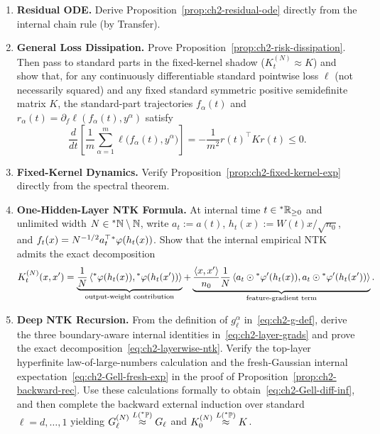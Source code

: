 \begin{enumerate}
\item \textbf{Residual ODE.} Derive Proposition~\ref{prop:ch2-residual-ode} directly from the internal chain rule (by Transfer).

\item \textbf{General Loss Dissipation.} Prove Proposition~\ref{prop:ch2-risk-dissipation}. Then pass to standard parts in the fixed-kernel shadow ($K_t^{(N)} \approx K$) and show that, for any continuously differentiable standard pointwise loss $\ell$ (not necessarily squared) and any fixed standard symmetric positive semidefinite matrix $K$, the standard-part trajectories $f_\alpha(t)$ and $r_\alpha(t) = \partial_f \ell(f_\alpha(t), y^\alpha)$ satisfy
\begin{equation}\label{eq:ch2-ex-gen-loss}
\frac{d}{dt}\left[ \frac{1}{m} \sum_{\alpha=1}^{m} \ell\bigl(f_\alpha(t), y^\alpha\bigr) \right] = -\frac{1}{m^2} r(t)^\top K r(t) \le 0.
\end{equation}

\item \textbf{Fixed-Kernel Dynamics.} Verify Proposition~\ref{prop:ch2-fixed-kernel-exp} directly from the spectral theorem.

\item \textbf{One-Hidden-Layer NTK Formula.} At internal time $t \in {}^*\mathbb{R}_{\ge 0}$ and unlimited width $N \in {}^*\mathbb{N} \setminus \mathbb{N}$, write $a_t := a(t)$, $h_t(x) := W(t)x / \sqrt{n_0}$, and $f_t(x) = N^{-1/2} a_t^\top {}^*\varphi(h_t(x))$. Show that the internal empirical NTK admits the exact decomposition
\begin{equation}\label{eq:ch2-ex-1layer-ntk}
K_t^{(N)}(x, x')
= \underbrace{\frac{1}{N} \left\langle {}^*\varphi(h_t(x)), {}^*\varphi(h_t(x')) \right\rangle}_{\text{output-weight contribution}}
+ \underbrace{\frac{\left\langle x, x' \right\rangle}{n_0} \frac{1}{N} \left\langle a_t \odot {}^*\varphi'(h_t(x)), a_t \odot {}^*\varphi'(h_t(x')) \right\rangle}_{\text{feature-gradient term}}.
\end{equation}

\item \textbf{Deep NTK Recursion.} From the definition of $g_\ell^\alpha$ in~\eqref{eq:ch2-g-def}, derive the three boundary-aware internal identities in~\eqref{eq:ch2-layer-grads} and prove the exact decomposition~\eqref{eq:ch2-layerwise-ntk}. Verify the top-layer hyperfinite law-of-large-numbers calculation and the fresh-Gaussian internal expectation~\eqref{eq:ch2-Gell-fresh-exp} in the proof of Proposition~\ref{prop:ch2-backward-rec}. Use these calculations formally to obtain~\eqref{eq:ch2-Gell-diff-inf}, and then complete the backward external induction over standard $\ell = d, \dots, 1$ yielding $G_\ell^{(N)} \stackrel{L({}^*\mathbb{P})}{\approx} G_\ell$ and $K_0^{(N)} \stackrel{L({}^*\mathbb{P})}{\approx} K$.
\end{enumerate}
